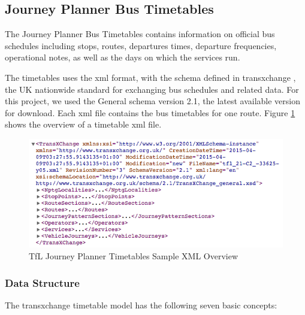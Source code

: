 \subsection{Journey Planner Bus Timetables}
The Journey Planner Bus Timetables \cite{open_data_feeds_description} contains information on official bus schedules including stops, routes, departures times, departure frequencies, operational notes, as well as the days on which the services run.

The timetables uses the \acrfull{xml} \cite{xml} format, with the schema defined in \gls{transxchange} \cite{transxchange}, the UK nationwide standard for exchanging bus schedules and related data. For this project, we used the General schema version 2.1\cite{transxchange_downloads_and_schema}\cite{transxchange_schema_2.1_xsd}, the latest available version for download. Each \acrshort{xml} file contains the bus timetables for one route. Figure \ref{fig:xml_components} shows the overview of a timetable \acrshort{xml} file.

\begin{figure}
\centering
\includegraphics[width=1\textwidth]{figures/xml_components.png}
\caption{\label{fig:xml_components} TfL Journey Planner Timetables Sample XML Overview}
\end{figure}

\subsubsection{Data Structure}
The \gls{transxchange} timetable model has the following seven basic concepts\cite{transxchange_schema_guide}:

